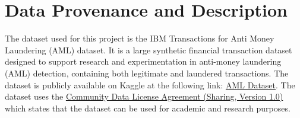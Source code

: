 \section{Data Provenance and Description}

The dataset used for this project is the IBM Transactions for Anti Money Laundering (AML) dataset. It is a large synthetic financial transaction dataset designed to support research and experimentation in anti-money laundering (AML) detection, containing both legitimate and laundered transactions. The dataset is publicly available on Kaggle at the following link: \href{https://www.kaggle.com/datasets/ealtman2019/ibm-transactions-for-anti-money-laundering-aml?select=HI-Large_Trans.csv}{AML Dataset}. The dataset uses the \href{https://cdla.dev/sharing-1-0/}{Community Data License Agreement (Sharing, Version 1.0)} which states that the dataset can be used for
academic and research purposes.